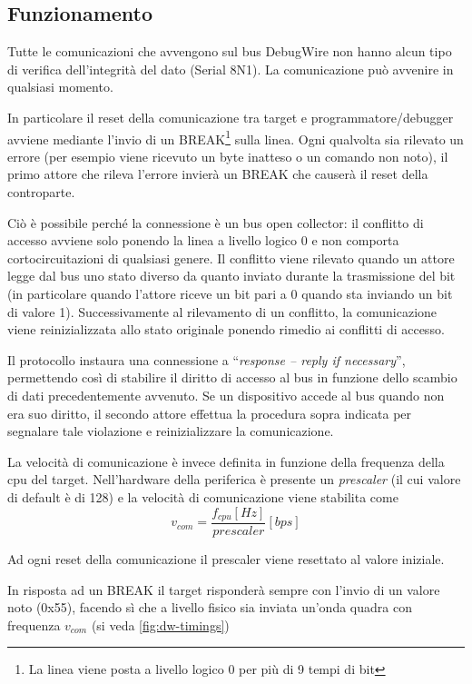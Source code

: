 \subsection{Funzionamento}\label{sec:dwworkings}

Tutte le comunicazioni che avvengono sul bus DebugWire non hanno alcun tipo di verifica dell'integrità del dato (Serial 8N1). La comunicazione può avvenire in qualsiasi momento.

In particolare il reset della comunicazione tra target e programmatore/debugger avviene mediante l'invio di un BREAK\footnote{La linea viene posta a livello logico 0 per più di 9 tempi di bit} sulla linea.
Ogni qualvolta sia rilevato un errore (per esempio viene ricevuto un byte inatteso o un comando non noto), il primo attore che rileva l'errore invierà un BREAK che causerà il reset della controparte.

Ciò è possibile perché la connessione è un bus open collector: il conflitto di accesso avviene solo ponendo la linea a livello logico 0 e non comporta cortocircuitazioni di qualsiasi genere. Il conflitto viene rilevato quando un attore legge dal bus uno stato diverso da quanto inviato durante la trasmissione del bit (in particolare quando l'attore riceve un bit pari a 0 quando sta inviando un bit di valore 1). Successivamente al rilevamento di un conflitto, la comunicazione viene reinizializzata allo stato originale ponendo rimedio ai conflitti di accesso. 

Il protocollo instaura una connessione a ``\textit{response -- reply if necessary}'', permettendo così di stabilire il diritto di accesso al bus in funzione dello scambio di dati precedentemente avvenuto. Se un dispositivo accede al bus quando non era suo diritto, il secondo attore effettua la procedura sopra indicata per segnalare tale violazione e reinizializzare la comunicazione.

La velocità di comunicazione è invece definita in funzione della frequenza della cpu del target. Nell'hardware della periferica è presente un \textit{prescaler} (il cui valore di default è di 128) e la velocità di comunicazione viene stabilita come \[v_{com} = \frac{f_{cpu} [Hz]}{prescaler}[bps]\]

Ad ogni reset della comunicazione il prescaler viene resettato al valore iniziale.

In risposta ad un BREAK il target risponderà sempre con l'invio di un valore noto (0x55), facendo sì che a livello fisico sia inviata un'onda quadra con frequenza \(v_{com}\)\cite{site:dw-reverse-engeneering} (si veda \cref{fig:dw-timings})

